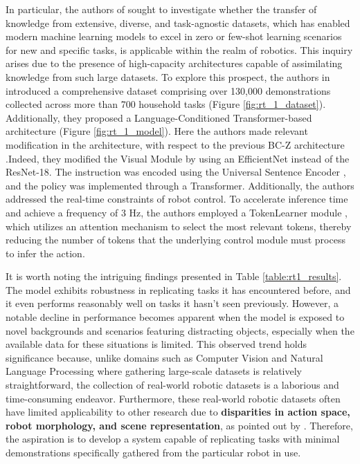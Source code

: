 In particular, the authors of \cite{brohan2022rt} sought to investigate whether the transfer of knowledge from extensive, diverse, and task-agnostic datasets, which has enabled modern machine learning models to excel in zero or few-shot learning scenarios for new and specific tasks, is applicable within the realm of robotics. This inquiry arises due to the presence of high-capacity architectures capable of assimilating knowledge from such large datasets. To explore this prospect, the authors in \cite{brohan2022rt} introduced a comprehensive dataset comprising over 130,000 demonstrations collected across more than 700 household tasks (Figure \ref{fig:rt_1_dataset}). Additionally, they proposed a Language-Conditioned Transformer-based architecture (Figure \ref{fig:rt_1_model}). Here the authors made relevant modification in the architecture, with respect to the previous BC-Z architecture \cite{jang2022bc_z}.Indeed, they modified the Visual Module by using an EfficientNet \cite{tan2019efficientnet} instead of the ResNet-18. The instruction was encoded using the Universal Sentence Encoder \cite{cer2018universal}, and the policy was implemented through a Transformer. Additionally, the authors addressed the real-time constraints of robot control. To accelerate inference time and achieve a frequency of $3$ Hz, the authors employed a TokenLearner module \cite{ryoo2021tokenlearner}, which utilizes an attention mechanism to select the most relevant tokens, thereby reducing the number of tokens that the underlying control module must process to infer the action.


It is worth noting the intriguing findings presented in Table \ref{table:rt1_results}. The model exhibits robustness in replicating tasks it has encountered before, and it even performs reasonably well on tasks it hasn't seen previously. However, a notable decline in performance becomes apparent when the model is exposed to novel backgrounds and scenarios featuring distracting objects, especially when the available data for these situations is limited. This observed trend holds significance because, unlike domains such as Computer Vision and Natural Language Processing where gathering large-scale datasets is relatively straightforward, the collection of real-world robotic datasets is a laborious and time-consuming endeavor. Furthermore, these real-world robotic datasets often have limited applicability to other research due to \textbf{disparities in action space, robot morphology, and scene representation}, as pointed out by \cite{brohan2022rt}. Therefore, the aspiration is to develop a system capable of replicating tasks with minimal demonstrations specifically gathered from the particular robot in use.
